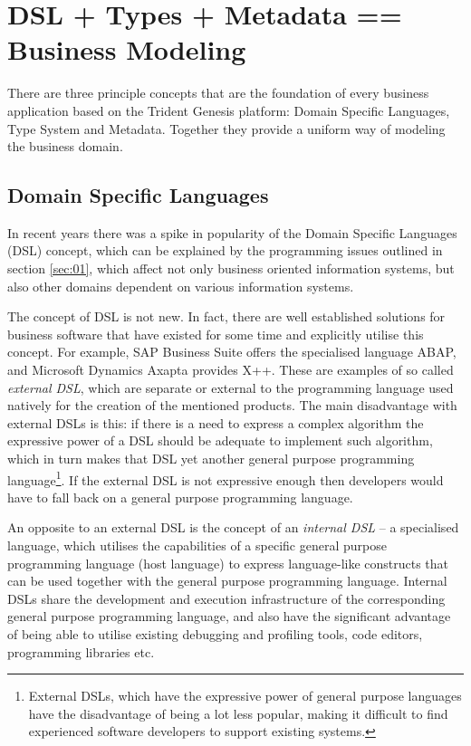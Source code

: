 \section{DSL + Types + Metadata == Business Modeling}\label{sec:03}

  There are three principle concepts that are the foundation of every business application based on the Trident Genesis platform: Domain Specific Languages, Type System and Metadata.
  Together they provide a uniform way of modeling the business domain.

\subsection{Domain Specific Languages}

  In recent years there was a spike in popularity of the Domain Specific Languages (DSL) concept, which can be explained by the programming issues outlined in section \ref{sec:01}, which affect not only business oriented information systems, but also other domains dependent on various information systems.

  The concept of DSL is not new.
  In fact, there are well established solutions for business software that have existed for some time and explicitly utilise this concept.
  For example, SAP Business Suite offers the specialised language ABAP, and Microsoft Dynamics Axapta provides X++.
  These are examples of so called \emph{external DSL}, which are separate or external to the programming language used natively for the creation of the mentioned products.
  The main disadvantage with external DSLs is this: if there is a need to express a complex algorithm the expressive power of a DSL should be adequate to implement such algorithm, which in turn makes that DSL yet another general purpose programming language\footnote{External DSLs, which have the expressive power of general purpose languages have the disadvantage of being a lot less popular, making it difficult to find experienced software developers to support existing systems.}.
  If the external DSL is not expressive enough then developers would have to fall back on a general purpose programming language.

  An opposite to an external DSL is the concept of an \emph{internal DSL} -- a specialised language, which utilises the capabilities of a specific general purpose programming language (host language) to express language-like constructs that can be used together with the general purpose programming language.
  Internal DSLs share the development and execution infrastructure of the corresponding general purpose programming language, and also have the significant advantage of being able to utilise existing debugging and profiling tools, code editors, programming libraries etc.

